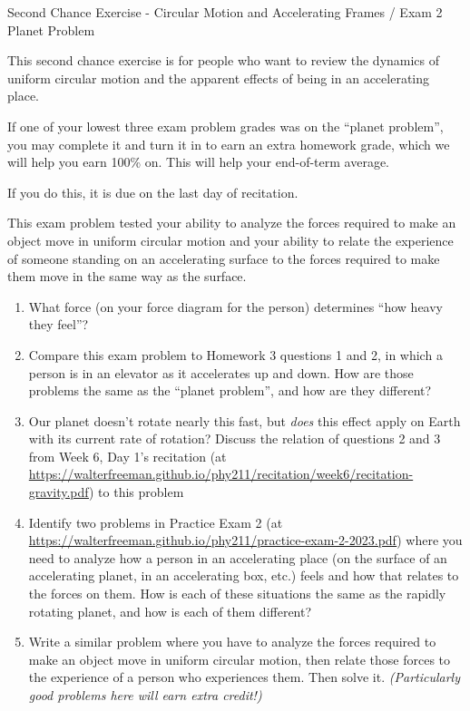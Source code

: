 \documentclass[12pt]{article}
\begin{document}
\begin{center}
\Large
\sc Second Chance Exercise - Circular Motion and Accelerating Frames / Exam 2 Planet Problem \rm





\normalsize
This second chance exercise is for people who want to review the dynamics of uniform circular motion and the apparent effects of being in an accelerating place.

If one of your lowest three exam problem grades was on the ``planet problem'', you may complete it and turn it in to earn an extra homework grade, which we will help you earn 100\% on. This will help your end-of-term average.

If you do this, it is due on the last day of recitation.

\end{center}

\vspace{1.5in}

This exam problem tested your ability to analyze the forces required to make an object move in uniform circular motion and your ability to relate the experience of someone standing on an accelerating surface to the forces required to make them move in the same way as the surface.

\begin{enumerate}
	
		\item What force (on your force diagram for the person) determines ``how heavy they feel''?
	
		\item Compare this exam problem to Homework 3 questions 1 and 2, in which a person is in an elevator as it accelerates up and down. How are those problems the same as the ``planet problem'', and how are they different?
		
	\item Our planet doesn't rotate nearly this fast, but {\it does} this effect apply on Earth with its current rate of rotation? Discuss the relation of questions 2 and 3 from Week 6, Day 1's recitation (at \url{https://walterfreeman.github.io/phy211/recitation/week6/recitation-gravity.pdf}) to this problem

	\item Identify two problems in Practice Exam 2 (at \url{https://walterfreeman.github.io/phy211/practice-exam-2-2023.pdf}) where you need to analyze how a person in an accelerating place (on the surface of an accelerating planet, in an accelerating box, etc.) feels and how that relates to the forces on them. How is each of these situations the same as the rapidly rotating planet, and how is each of them different?
	

	
    \item Write a similar problem where you have to analyze the forces required to make an object move in uniform circular motion, then relate those forces to the experience of a person who experiences them. Then solve it. {\it (Particularly good problems here will earn extra credit!)}
\end{enumerate}
\end{document}
